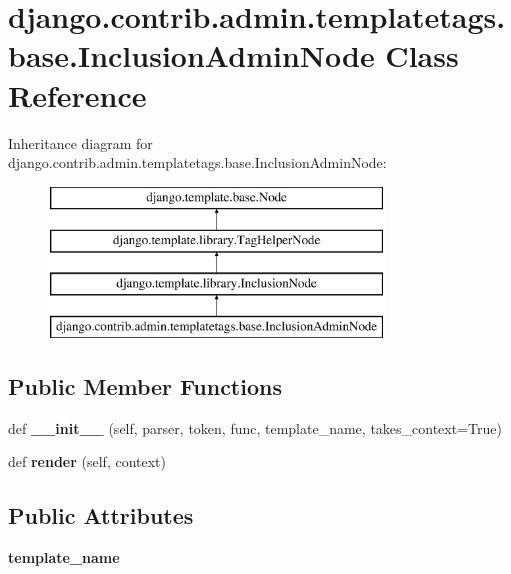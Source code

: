 \hypertarget{classdjango_1_1contrib_1_1admin_1_1templatetags_1_1base_1_1_inclusion_admin_node}{}\section{django.\+contrib.\+admin.\+templatetags.\+base.\+Inclusion\+Admin\+Node Class Reference}
\label{classdjango_1_1contrib_1_1admin_1_1templatetags_1_1base_1_1_inclusion_admin_node}
Inheritance diagram for django.\+contrib.\+admin.\+templatetags.\+base.\+Inclusion\+Admin\+Node\+:\begin{figure}[H]
\begin{center}
\leavevmode
\includegraphics[height=4.000000cm]{classdjango_1_1contrib_1_1admin_1_1templatetags_1_1base_1_1_inclusion_admin_node}
\end{center}
\end{figure}
\subsection*{Public Member Functions}
\begin{DoxyCompactItemize}
\item 
\mbox{\label{classdjango_1_1contrib_1_1admin_1_1templatetags_1_1base_1_1_inclusion_admin_node_adabc3811074dca27d611cc6c0e339cb1}} 
def {\bfseries \+\_\+\+\_\+init\+\_\+\+\_\+} (self, parser, token, func, template\+\_\+name, takes\+\_\+context=True)
\item 
\mbox{\label{classdjango_1_1contrib_1_1admin_1_1templatetags_1_1base_1_1_inclusion_admin_node_a383dd1095f1b533f8de7e8a7b449ba8d}} 
def {\bfseries render} (self, context)
\end{DoxyCompactItemize}
\subsection*{Public Attributes}
\begin{DoxyCompactItemize}
\item 
\mbox{\label{classdjango_1_1contrib_1_1admin_1_1templatetags_1_1base_1_1_inclusion_admin_node_a4edc40e6138cd08334a7d9c26f959ab2}} 
{\bfseries template\+\_\+name}
\end{DoxyCompactItemize}
